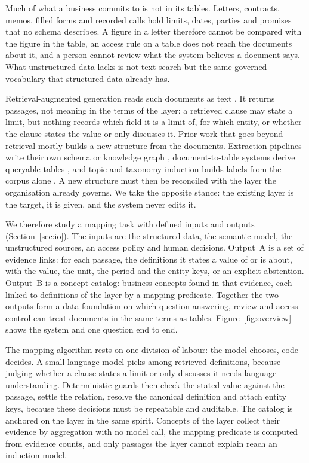 \documentclass[11pt,a4paper]{article}
\begin{document}
Much of what a business commits to is not in its tables. Letters, contracts, memos, filled forms and recorded calls hold limits, dates, parties and promises that no schema describes. A figure in a letter therefore cannot be compared with the figure in the table, an access rule on a table does not reach the documents about it, and a person cannot review what the system believes a document says. What unstructured data lacks is not text search but the same governed vocabulary that structured data already has.

Retrieval-augmented generation reads such documents as text \cite{lewis2020rag}. It returns passages, not meaning in the terms of the layer: a retrieved clause may state a limit, but nothing records which field it is a limit of, for which entity, or whether the clause states the value or only discusses it. Prior work that goes beyond retrieval mostly builds a new structure from the documents. Extraction pipelines write their own schema or knowledge graph \cite{zhang2024edc,bai2025autoschemakg,edge2024graphrag}, document-to-table systems derive queryable tables \cite{arora2023evaporate}, and topic and taxonomy induction builds labels from the corpus alone \cite{pham2024topicgpt,wan2024tntllm}. A new structure must then be reconciled with the layer the organisation already governs. We take the opposite stance: the existing layer is the target, it is given, and the system never edits it.

We therefore study a mapping task with defined inputs and outputs (Section~\ref{sec:io}). The inputs are the structured data, the semantic model, the unstructured sources, an access policy and human decisions. Output~A is a set of evidence links: for each passage, the definitions it states a value of or is about, with the value, the unit, the period and the entity keys, or an explicit abstention. Output~B is a concept catalog: business concepts found in that evidence, each linked to definitions of the layer by a mapping predicate. Together the two outputs form a data foundation on which question answering, review and access control can treat documents in the same terms as tables. Figure~\ref{fig:overview} shows the system and one question end to end.

The mapping algorithm rests on one division of labour: the model chooses, code decides. A small language model picks among retrieved definitions, because judging whether a clause states a limit or only discusses it needs language understanding. Deterministic guards then check the stated value against the passage, settle the relation, resolve the canonical definition and attach entity keys, because these decisions must be repeatable and auditable. The catalog is anchored on the layer in the same spirit. Concepts of the layer collect their evidence by aggregation with no model call, the mapping predicate is computed from evidence counts, and only passages the layer cannot explain reach an induction model.
\end{document}
